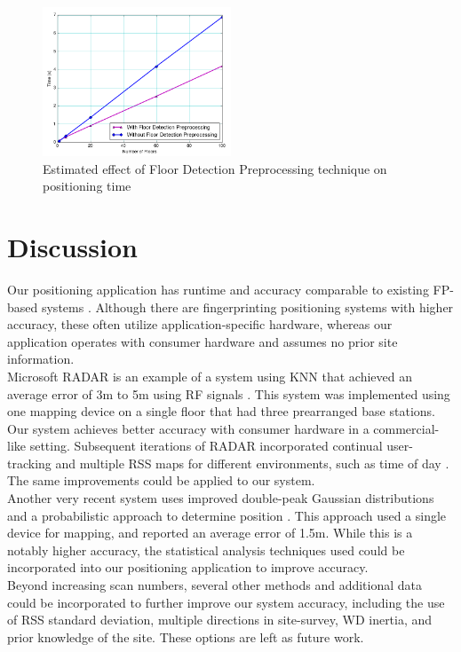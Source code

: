 \documentclass[conference]{IEEEtran}
\begin{document}
\begin{figure}[t!]
  \centering
    \includegraphics[width=0.5\textwidth]{time_comparison.png}
   \caption{Estimated effect of Floor Detection Preprocessing technique on positioning time}
   \label{fig:floor_preprocessing_effect}
\end{figure}

\section{Discussion}
\indent Our positioning application has runtime and accuracy comparable to existing FP-based systems \cite{Liu}. Although there are fingerprinting positioning systems with higher accuracy, these often utilize application-specific hardware, whereas our application operates with consumer hardware and assumes no prior site information.\\
\indent Microsoft RADAR is an example of a system using KNN that achieved an average error of 3m to 5m using RF signals \cite{Bahl}. This system was implemented using one mapping device on a single floor that had three prearranged base stations. Our system achieves better accuracy with consumer hardware in a commercial-like setting. Subsequent iterations of RADAR incorporated continual user-tracking and multiple RSS maps for different environments, such as time of day \cite{Bahl2}. The same improvements could be applied to our system.\\
\indent Another very recent system uses improved double-peak Gaussian distributions and a probabilistic approach to determine position \cite{Chen}. This approach used a single device for mapping, and reported an average error of 1.5m. While this is a notably higher accuracy, the statistical analysis techniques used could be incorporated into our positioning application to improve accuracy.\\ 
\indent Beyond increasing scan numbers, several other methods and additional data could be incorporated to further improve our system accuracy, including the use of RSS standard deviation, multiple directions in site-survey, WD inertia, and prior knowledge of the site. These options are left as future work.
\end{document}
